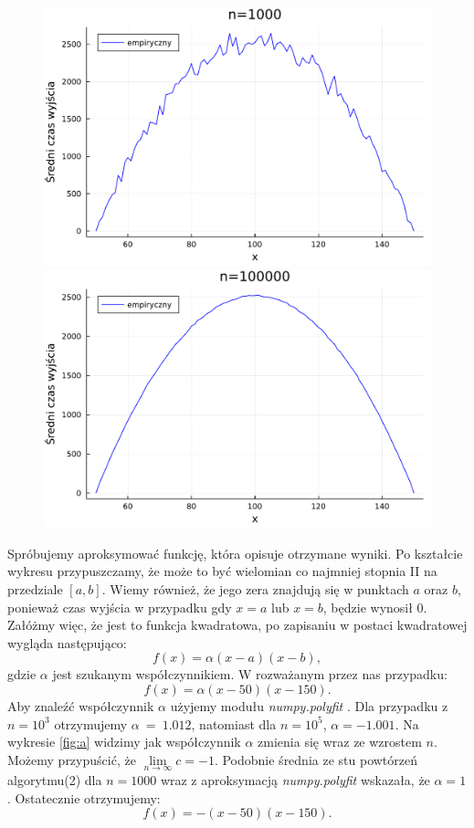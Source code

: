 \documentclass{article}
\theoremstyle{break}
\numberwithin{equation}{subsection}
\numberwithin{figure}{section}
\begin{document}
\begin{figure}[H]
	\begin{multicols}{2}
	\begin{center}
	\includegraphics[scale=0.30]{time100.pdf}
	\caption{}
	\label{fig:a1}
	\includegraphics[scale=0.30]{time100000.pdf}
	\caption{}
	\label{fig:a2}
	\end{center}
	\end{multicols}
\end{figure}
Spróbujemy aproksymować funkcję, która opisuje otrzymane wyniki. Po kształcie wykresu przypuszczamy, że może to być wielomian co najmniej stopnia II na przedziale $[a,b]$. Wiemy również, że jego zera znajdują się w punktach $a$ oraz $b$, ponieważ czas wyjścia w przypadku gdy $x=a$ lub $x=b$, będzie wynosił 0. Załóżmy więc, że jest to funkcja kwadratowa, po zapisaniu w postaci kwadratowej wygląda następująco:
$$f(x)=\alpha(x-a)(x-b),$$
gdzie $\alpha$ jest szukanym współczynnikiem. W rozważanym przez nas przypadku:
$$f(x)=\alpha(x-50)(x-150).$$
Aby znaleźć współczynnik $\alpha$ użyjemy modułu \textit{numpy.polyfit} \cite{polyfit}. Dla przypadku z $n=10^3$ otrzymujemy $\alpha~=~1.012$, natomiast dla $n=10^5$, $\alpha=-1.001$. Na wykresie \ref{fig:a} widzimy jak współczynnik $\alpha$ zmienia się wraz ze wzrostem $n$. Możemy przypuścić, że $\lim\limits_{n\rightarrow\infty}c=-1$. Podobnie średnia ze stu powtórzeń algorytmu(2) dla $n=1000$ wraz z aproksymacją \textit{numpy.polyfit} wskazała, że $\alpha=1$. Ostatecznie otrzymujemy:
$$f(x)=-(x-50)(x-150).$$
\end{document}
